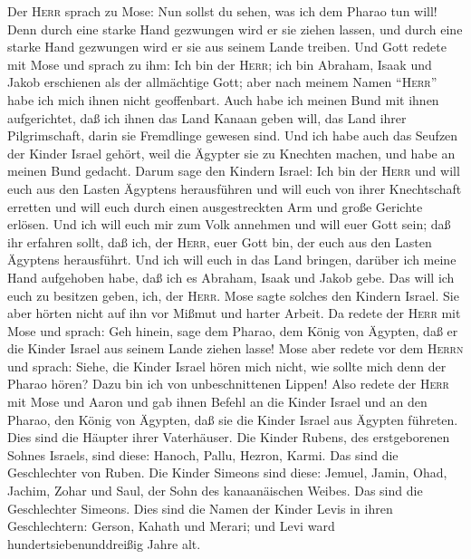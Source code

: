  Der \textsc{Herr} sprach zu Mose: Nun sollst du sehen,
was ich dem Pharao tun will! Denn durch eine starke Hand gezwungen wird
er sie ziehen lassen, und durch eine starke Hand gezwungen wird er sie
aus seinem Lande treiben.  Und Gott redete mit Mose und
sprach zu ihm: Ich bin der \textsc{Herr};  ich bin
Abraham, Isaak und Jakob erschienen als der allmächtige Gott; aber nach
meinem Namen ``\textsc{Herr}'' habe ich mich ihnen nicht geoffenbart.
 Auch habe ich meinen Bund mit ihnen aufgerichtet, daß ich
ihnen das Land Kanaan geben will, das Land ihrer Pilgrimschaft, darin
sie Fremdlinge gewesen sind.  Und ich habe auch das
Seufzen der Kinder Israel gehört, weil die Ägypter sie zu Knechten
machen, und habe an meinen Bund gedacht.  Darum sage den
Kindern Israel: Ich bin der \textsc{Herr} und will euch aus den Lasten
Ägyptens herausführen und will euch von ihrer Knechtschaft erretten und
will euch durch einen ausgestreckten Arm und große Gerichte erlösen.
 Und ich will euch mir zum Volk annehmen und will euer
Gott sein; daß ihr erfahren sollt, daß ich, der \textsc{Herr}, euer Gott
bin, der euch aus den Lasten Ägyptens herausführt.  Und
ich will euch in das Land bringen, darüber ich meine Hand aufgehoben
habe, daß ich es Abraham, Isaak und Jakob gebe. Das will ich euch zu
besitzen geben, ich, der \textsc{Herr}.  Mose sagte
solches den Kindern Israel. Sie aber hörten nicht auf ihn vor Mißmut und
harter Arbeit.  Da redete der \textsc{Herr} mit Mose und
sprach:  Geh hinein, sage dem Pharao, dem König von
Ägypten, daß er die Kinder Israel aus seinem Lande ziehen lasse!
 Mose aber redete vor dem \textsc{Herrn} und sprach:
Siehe, die Kinder Israel hören mich nicht, wie sollte mich denn der
Pharao hören? Dazu bin ich von unbeschnittenen Lippen! 
Also redete der \textsc{Herr} mit Mose und Aaron und gab ihnen Befehl an
die Kinder Israel und an den Pharao, den König von Ägypten, daß sie die
Kinder Israel aus Ägypten führeten.  Dies sind die
Häupter ihrer Vaterhäuser. Die Kinder Rubens, des erstgeborenen Sohnes
Israels, sind diese: Hanoch, Pallu, Hezron, Karmi. Das sind die
Geschlechter von Ruben.  Die Kinder Simeons sind diese:
Jemuel, Jamin, Ohad, Jachim, Zohar und Saul, der Sohn des kanaanäischen
Weibes. Das sind die Geschlechter Simeons.  Dies sind die
Namen der Kinder Levis in ihren Geschlechtern: Gerson, Kahath und
Merari; und Levi ward hundertsiebenunddreißig Jahre alt. 
